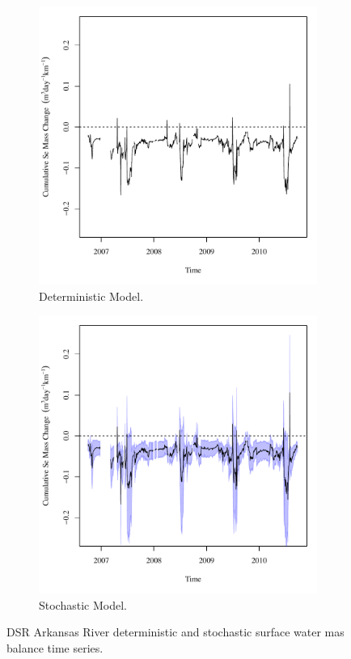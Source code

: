 \begin{linenumbers}
\begin{figure}[htbp]
\centering
	\begin{subfigure}{0.5\textwidth}
		\centering
		\includegraphics[width=0.9\linewidth]{"Figures/Results_DDSR/Balance Mass - Flux"}
		\caption{Deterministic Model.}
		\label{sub:DSRMassStoreD}
	\end{subfigure}%
	\begin{subfigure}{0.5\textwidth}
		\centering
		\includegraphics[width=0.9\linewidth]{"Figures/Results_DSR/Balance Mass - Flux"}
		\caption{Stochastic Model.}
		\label{sub:DSRMassStoreS}
	\end{subfigure}
		\caption[DSR Arkansas River deterministic and stochastic surface water mas balance time series.]{DSR Arkansas River deterministic and stochastic surface water mas balance time series.}
	\label{fig:DSRMassStore}
\end{figure}


\end{linenumbers}
